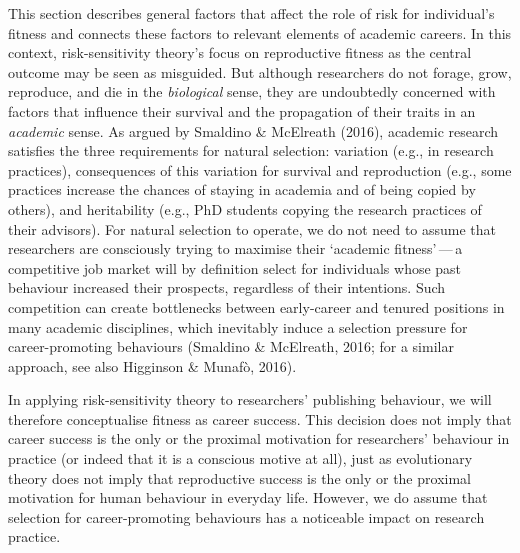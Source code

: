 \documentclass[
  ,man,mask,floatsintext]{apa6}
\begin{document}
This section describes general factors that affect the role of risk for individual's fitness and connects these factors to relevant elements of academic careers.
In this context, risk-sensitivity theory's focus on reproductive fitness as the central outcome may be seen as misguided.
But although researchers do not forage, grow, reproduce, and die in the \emph{biological} sense,
they are undoubtedly concerned with factors that influence
their survival and the propagation of their traits in an \emph{academic} sense.
As argued by Smaldino \& McElreath (2016), academic research satisfies the three requirements for natural selection:
variation (e.g., in research practices), consequences of this variation for survival and reproduction (e.g., some practices increase the chances of staying in academia and of being copied by others), and heritability (e.g., PhD students copying the research practices of their advisors).
For natural selection to operate,
we do not need to assume that researchers are consciously trying to maximise their `academic fitness'\(\,\)---\(\,\)a competitive job market will by definition select for individuals whose past behaviour increased their prospects, regardless of their intentions.
Such competition can create bottlenecks between early-career and tenured positions in many academic disciplines, which inevitably induce a selection pressure for career-promoting behaviours (Smaldino \& McElreath, 2016; for a similar approach, see also Higginson \& Munafò, 2016).

In applying risk-sensitivity theory to researchers' publishing behaviour, we will therefore conceptualise fitness as career success.
This decision does not imply that career success is the only or the proximal motivation for researchers' behaviour in practice (or indeed that it is a conscious motive at all), just as evolutionary theory does not imply that reproductive success is the only or the proximal motivation for human behaviour in everyday life.
However, we do assume that selection for career-promoting behaviours has a noticeable impact on research practice.
\end{document}
